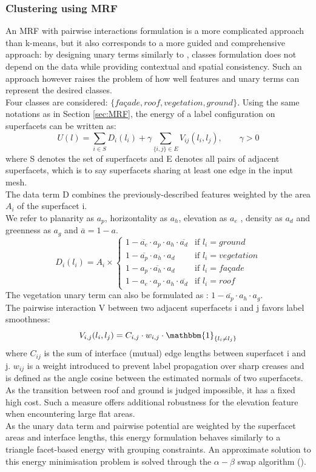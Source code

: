 \documentclass{kththesis}
\begin{document}
\subsubsection{Clustering using MRF}
An MRF with pairwise interactions formulation is a more complicated approach than k-means, but it also corresponds to a more guided and comprehensive approach: by designing unary terms similarly to \textcite{verdie}, classes formulation does not depend on the data while providing contextual and spatial consistency. Such an approach however raises the problem of how well features and unary terms can represent the desired classes. \\
Four classes are considered: $\{fa\textit{ç}ade, roof, vegetation, ground\}$.
Using the same notations as in Section \ref{sec:MRF}, the energy of a label configuration on superfacets can be written as: 
\[ U(l)=
\sum \limits_{i\in S} D_i(l_i) + \gamma  \sum \limits_{\{i,j\} \in E} V_{ij}(l_i, l_j) , \qquad \gamma>0
\] 
where S denotes the set of superfacets and E denotes all pairs of adjacent superfacets, which is to say superfacets sharing at least one edge in the input mesh. \\
The data term D combines the previously-described features weighted by the area $A_i$ of the superfacet i. \\
We refer to planarity as $a_p$, horizontality as $a_h$, elevation as $a_e$ , density as $a_d$ and greenness as $a_g$ and $\overline{a} = 1 - a$.
$$
D_i(l_i) = A_i \times  \left\{
    \begin{array}{lll}
        1 -  \overline{a_e} \cdot a_p \cdot a_h  \cdot \overline{a_d}& \mbox{if } l_i=ground \\
        1 -   \overline{a_p} \cdot a_h  \cdot a_d &  \mbox{if } l_i=vegetation   \\
        1 -   a_p \cdot \overline{a_h}  \cdot a_d & \mbox{if } l_i=fa\textit{ç}ade \\
        1 -  a_e \cdot a_p \cdot a_h  \cdot \overline{a_d} & \mbox{if } l_i=roof
    \end{array}
\right.
$$
The vegetation unary term can also be formulated as : $ 1 -   \overline{a_p} \cdot a_h  \cdot a_g $. \\
The pairwise interaction V between two adjacent
superfacets i and j favors label smoothness: 
$$V_{i,j}(l_i, l_j)=C_{i,j} \cdot w_{i,j} \cdot \mathbbm{1}_{\{l_i \neq l_j\}}$$
where $C_{ij}$ is the sum of interface (mutual)
edge lengths between superfacet i and j.   $w_{ij}$ is a weight introduced to prevent label propagation over sharp creases and is defined as
the angle cosine between the estimated normals of two superfacets. As the transition between roof and ground is judged impossible, it has a fixed high cost. Such a measure offers additional robustness for the elevation feature when encountering large flat areas. \\
As the unary data term and pairwise potential are weighted by the
superfacet areas and interface lengths, this energy formulation behaves
similarly to a triangle facet-based energy with grouping constraints.
An approximate solution to this energy minimisation problem
is solved through the $\alpha-\beta$ swap algorithm (\textcite{BoykovEnergyMinim}). 
\end{document}

